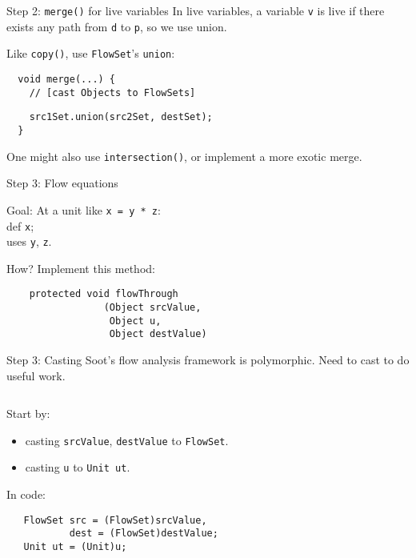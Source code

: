 \begin{slide}{Step 2: {\tt merge()} for live variables}
In live variables, a variable {\tt v} is live if there exists {\red any} path
from {\tt d} to {\tt p}, so we use {\red union}.

\qquad

Like {\tt copy()}, use {\tt FlowSet}'s {\tt union}:

\vspace*{0.05in}

\begin{verbatim}
  void merge(...) {
    // [cast Objects to FlowSets]
\end{verbatim}
{\red\verb+    src1Set.union(src2Set, destSet);+}\\
\verb+  }+

\vspace*{0.1in}

One might also use {\tt intersection()}, or implement a more exotic merge.

\end{slide}

\begin{slide}{Step 3: Flow equations}
\vspace*{-0.1in}

Goal: At a unit like {\tt x = y * z}:\\
\qquad {} def {\tt x};\\
\qquad {} uses {\tt y}, {\tt z}.

\vspace*{0.1in}

How? Implement this method:
\begin{verbatim}
    protected void flowThrough
                 (Object srcValue, 
                  Object u, 
                  Object destValue)
\end{verbatim}
\end{slide}

\begin{slide}{Step 3: Casting}
Soot's flow analysis framework is polymorphic.
Need to cast to do useful work.

$\quad$

Start by:
\begin{itemize}
\item casting {\tt srcValue}, {\tt destValue} to {\tt FlowSet}.

\item casting {\tt u} to {\tt Unit ut}.
\end{itemize}

In code:

\begin{verbatim}
   FlowSet src = (FlowSet)srcValue,
           dest = (FlowSet)destValue;
   Unit ut = (Unit)u;
\end{verbatim}
\end{slide}

